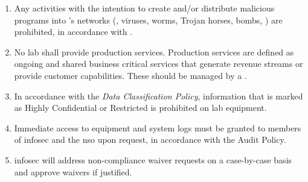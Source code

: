 \begin{enumerate}
\item
Any activities with the intention to create and/or distribute malicious programs into \CompanyName{}'s networks (\eg, viruses, worms, Trojan horses, \email{} bombs, \etc) are prohibited, in accordance with . 
\item
No lab shall provide production services.  
Production services are defined as ongoing and shared business critical services that generate revenue streams or provide customer capabilities.  
These should be managed by a \ProperSupportOrganization{}.
\item
In accordance with the \textit{Data Classification Policy}, information that is marked as \CompanyName{} Highly Confidential or \CompanyName{} Restricted is prohibited on lab equipment.
\item
Immediate access to equipment and system logs must be granted to members of \gls{infosec} and the \gls{nso} upon request, in accordance with the Audit Policy.
\item
\gls{infosec} will address non-compliance waiver requests on a case-by-case basis and approve waivers if justified.
\end{enumerate}
